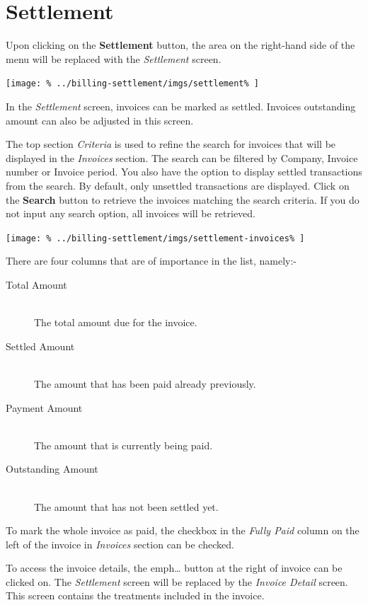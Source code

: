 \documentclass[../main/main]{subfiles}
\begin{document}
\newpage
\section{Settlement}
\label{sec:settlement}

Upon clicking on the \textbf{Settlement} button,
the area on the right-hand side of the menu will be replaced with the
\emph{Settlement} screen.

\texttt{[image: \%
  ../billing-settlement/imgs/settlement\%
]}

In the \emph{Settlement} screen, invoices can be marked as settled. Invoices
outstanding amount can also be adjusted in this screen.

The top section \emph{Criteria} is used to refine the search for invoices
that will be displayed in the \emph{Invoices} section.
The search can be filtered by Company, Invoice number or Invoice period.
You also have the option to display settled transactions from the search.
By default, only unsettled transactions are displayed.
Click on the \textbf{Search} button to retrieve the invoices matching the search
criteria. If you do not input any search option, all invoices will be retrieved.

\texttt{[image: \%
  ../billing-settlement/imgs/settlement-invoices\%
]}

\pagebreak
There are four columns that are of importance in the list, namely:-
\begin{description}
\item[Total Amount] \hfill \\
The total amount due for the invoice.
\item[Settled Amount] \hfill \\
The amount that has been paid already previously.
\item[Payment Amount] \hfill \\
The amount that is currently being paid.
\item[Outstanding Amount] \hfill \\
The amount that has not been settled yet.
\end{description}

To mark the whole invoice as paid, the checkbox in the \emph{Fully Paid} column
on the left of the invoice in \emph{Invoices} section can be checked.

To access the invoice details, the emph{\ldots} button at the right of invoice
can be clicked on. The \emph{Settlement} screen will be replaced by the
\emph{Invoice Detail} screen. This screen contains the treatments included
in the invoice.
\end{document}
